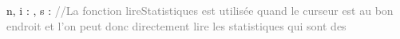 \begin{algorithme}
    {n, i : \naturel , s : \statistiques}
    {
    	\textcolor{gray}{//La fonction lireStatistiques est utilisée quand le curseur est au bon endroit et l'on peut donc directement lire les statistiques qui sont des \naturel}
    	{
    	}
    }
\end{algorithme}